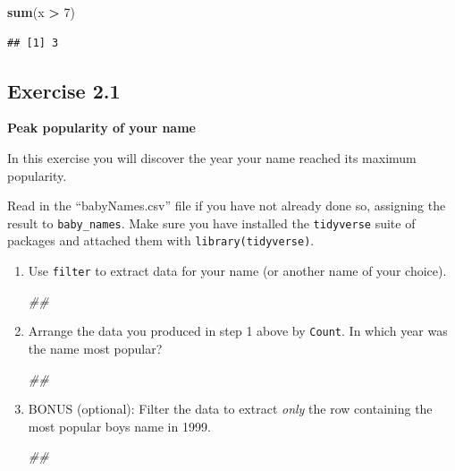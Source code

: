 \documentclass[
]{book}
\newenvironment{Shaded}{\begin{snugshade}}{\end{snugshade}}
\newcommand{\CommentTok}[1]{\textcolor[rgb]{0.56,0.35,0.01}{\textit{#1}}}
\newcommand{\DecValTok}[1]{\textcolor[rgb]{0.00,0.00,0.81}{#1}}
\newcommand{\KeywordTok}[1]{\textcolor[rgb]{0.13,0.29,0.53}{\textbf{#1}}}
\newcommand{\NormalTok}[1]{#1}
\newcommand{\OperatorTok}[1]{\textcolor[rgb]{0.81,0.36,0.00}{\textbf{#1}}}
\newcommand{\StringTok}[1]{\textcolor[rgb]{0.31,0.60,0.02}{#1}}
\begin{document}
\begin{Shaded}
\begin{Highlighting}[]
\KeywordTok{sum}\NormalTok{(x }\OperatorTok{\textgreater{}}\StringTok{ }\DecValTok{7}\NormalTok{)}
\end{Highlighting}
\end{Shaded}

\begin{verbatim}
## [1] 3
\end{verbatim}

\hypertarget{exercise-2.1}{%
\subsection{Exercise 2.1}\label{exercise-2.1}}

\textbf{Peak popularity of your name}

In this exercise you will discover the year your name reached its maximum popularity.

Read in the ``babyNames.csv'' file if you have not already done so, assigning the result to \texttt{baby\_names}. Make sure you have installed the \texttt{tidyverse} suite of packages and attached them with \texttt{library(tidyverse)}.

\begin{enumerate}
\def\labelenumi{\arabic{enumi}.}
\item
  Use \texttt{filter} to extract data for your name (or another name of your choice).

\begin{Shaded}
\begin{Highlighting}[]
\CommentTok{\#\#}
\end{Highlighting}
\end{Shaded}
\item
  Arrange the data you produced in step 1 above by \texttt{Count}. In which year was the name most popular?

\begin{Shaded}
\begin{Highlighting}[]
\CommentTok{\#\#}
\end{Highlighting}
\end{Shaded}
\item
  BONUS (optional): Filter the data to extract \emph{only} the row containing the most popular boys name in 1999.

\begin{Shaded}
\begin{Highlighting}[]
\CommentTok{\#\#}
\end{Highlighting}
\end{Shaded}
\end{enumerate}
\end{document}
